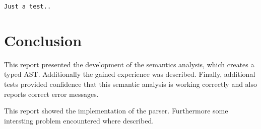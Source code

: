 \documentclass{article}
\begin{document}
\begin{lstlisting}[frame=single]
Just a test..
\end{lstlisting}

\section{Conclusion}
This report presented the development of the semantics analysis, which creates a typed AST. Additionally the gained experience was described. Finally, additional tests provided confidence that this semantic analysis is working correctly and also reports correct error messages.

This report showed the implementation of the parser. Furthermore some intersting problem encountered where described. 
\end{document}
